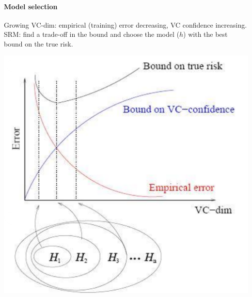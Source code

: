 \documentclass[10pt]{report}
\begin{document}
\paragraph{Model selection} Growing VC-dim: empirical (training) error decreasing, VC confidence increasing.\\
SRM: find a trade-off in the bound and choose the model ($h$) with the best bound on the true risk.
\begin{center}
	\includegraphics[scale=0.5]{16.png}
\end{center}
\end{document}
